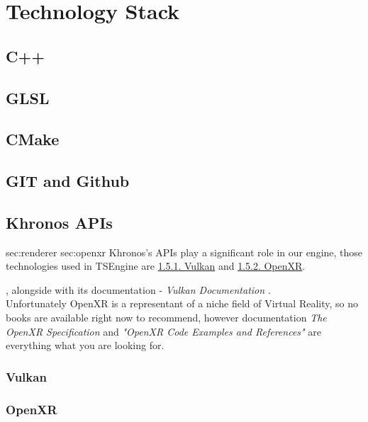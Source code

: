 \newpage
\section{Technology Stack}
\subsection{C++}
\subsection{GLSL}
\label{sec:glsl}
\subsection{CMake}
\label{sec:stack_cmake}
\subsection{GIT and Github}
\subsection{Khronos APIs}
\label{sec:khronos}
sec:renderer sec:openxr
Khronos's APIs play a significant role in our engine, those technologies used in TSEngine are \hyperref[sec:stack_vk]{\ref*{sec:stack_vk}. Vulkan} and \hyperref[sec:stack_xr]{\ref*{sec:stack_xr}. OpenXR}. 


\cite{VulkanCookbook}, alongside with its documentation - \textit{Vulkan Documentation} \cite{VkDoc}.\\ Unfortunately OpenXR is a representant of a niche field of Virtual Reality, so no books are available right now to recommend, however documentation \textit{The OpenXR Specification} \cite{XrDoc} and \textit{"OpenXR Code Examples and References"} \cite{OpenXrExamples} are everything what you are looking for. %


\subsubsection{Vulkan}
\label{sec:stack_vk}
\subsubsection{OpenXR}
\label{sec:stack_xr}
